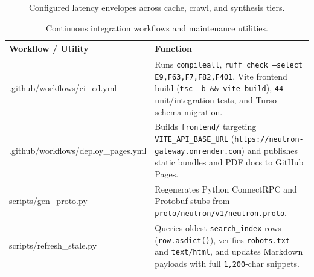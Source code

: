 \documentclass[10pt,a4paper]{article}
\begin{document}
\begin{figure}[H]
\centering
{}
\caption{Configured latency envelopes across cache, crawl, and synthesis tiers.}
\label{fig:latency-budgets}
\end{figure}

\begin{table}[H]
\centering
\small
\renewcommand{\arraystretch}{1.28}
\begin{tabularx}{\textwidth}{@{}>{\ttfamily\scriptsize\color{NavyPrimary}\raggedright\arraybackslash}p{5.4cm} >{\raggedright\arraybackslash}X@{}}
\toprule
\textbf{Workflow / Utility} & \textbf{Function} \\
\midrule
.github/workflows/ci\_cd.yml &
Runs \texttt{compileall}, \texttt{ruff check --select E9,F63,F7,F82,F401}, Vite frontend build (\texttt{tsc -b \&\& vite build}), \texttt{44} unit/integration tests, and Turso schema migration. \\
.github/workflows/deploy\_pages.yml &
Builds \texttt{frontend/} targeting \texttt{VITE\_API\_BASE\_URL} (\texttt{https://neutron-gateway.onrender.com}) and publishes static bundles and PDF docs to GitHub Pages. \\
scripts/gen\_proto.py &
Regenerates Python ConnectRPC and Protobuf stubs from \texttt{proto/neutron/v1/neutron.proto}. \\
scripts/refresh\_stale.py &
Queries oldest \texttt{search\_index} rows (\texttt{row.asdict()}), verifies \texttt{robots.txt} and \texttt{text/html}, and updates Markdown payloads with full \texttt{1,200}-char snippets. \\
\bottomrule
\end{tabularx}
\caption{Continuous integration workflows and maintenance utilities.}
\end{table}
\end{document}
